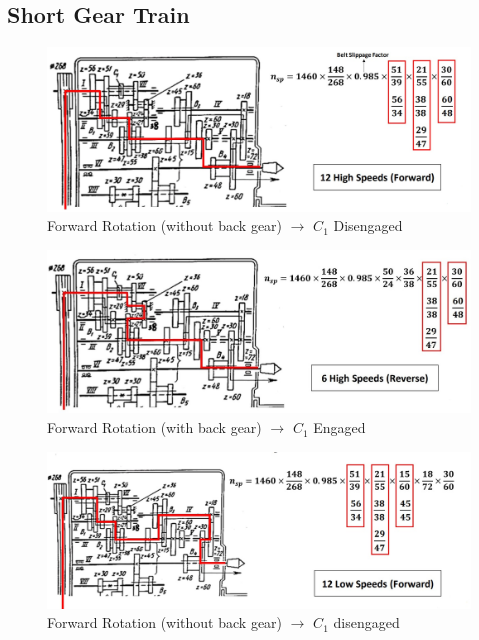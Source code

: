 \documentclass{article}
\begin{document}
\subsection*{Short Gear Train}
\begin{figure}[h]
  \centering
  \includegraphics[width=\linewidth]{img/short_gear_disengaged.jpeg}
  \caption{Forward Rotation (without back gear) $\rightarrow$ $C_1$ Disengaged}
\end{figure}

\begin{figure}[h] 
  \centering
  \includegraphics[width=\linewidth]{img/short_gear_engaged.jpeg}
  \caption{Forward Rotation (with back gear) $\rightarrow$ $C_1$ Engaged}
\end{figure}

\begin{figure}[h] 
  \centering
  \includegraphics[width=\linewidth]{img/long_gear_without_back.jpeg}
  \caption{Forward Rotation (without back gear) $\rightarrow$ $C_1$ disengaged}
\end{figure}
\end{document}
